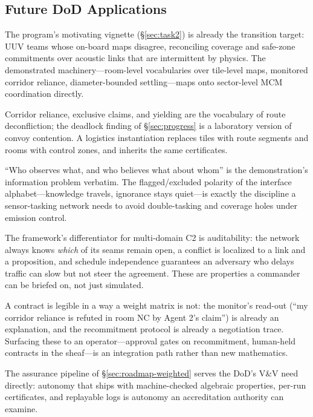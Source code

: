 \documentclass[11pt]{article}
\theoremstyle{definition}
\theoremstyle{remark}
\begin{document}
\subsection{Future DoD Applications}
\label{sec:roadmap-dod}

\begin{description}[leftmargin=1.6em, style=nextline]
\item[Mine countermeasures and littoral operations.]
The program's motivating vignette (\S\ref{sec:task2}) is already the transition target: UUV
teams whose on-board maps disagree, reconciling coverage and safe-zone commitments over
acoustic links that are intermittent by physics.
The demonstrated machinery---room-level vocabularies over tile-level maps, monitored corridor
reliance, diameter-bounded settling---maps onto sector-level MCM coordination directly.
\item[Contested logistics and resupply.]
Corridor reliance, exclusive claims, and yielding are the vocabulary of route deconfliction;
the deadlock finding of \S\ref{sec:progress} is a laboratory version of convoy contention.
A logistics instantiation replaces tiles with route segments and rooms with control zones, and
inherits the same certificates.
\item[Distributed ISR tasking.]
``Who observes what, and who believes what about whom'' is the demonstration's information
problem verbatim.
The flagged/excluded polarity of the interface alphabet---knowledge travels, ignorance stays
quiet---is exactly the discipline a sensor-tasking network needs to avoid double-tasking and
coverage holes under emission control.
\item[Command and control under degraded communications.]
The framework's differentiator for multi-domain C2 is auditability: the network always knows
\emph{which} of its seams remain open, a conflict is localized to a link and a proposition,
and schedule independence guarantees an adversary who delays traffic can slow but not steer
the agreement.
These are properties a commander can be briefed on, not just simulated.
\item[Human--machine teaming.]
A contract is legible in a way a weight matrix is not: the monitor's read-out (``my corridor
reliance is refuted in room NC by Agent 2's claim'') is already an explanation, and the
recommitment protocol is already a negotiation trace.
Surfacing these to an operator---approval gates on recommitment, human-held contracts in the
sheaf---is an integration path rather than new mathematics.
\item[Test, evaluation, and assurance of autonomy.]
The assurance pipeline of \S\ref{sec:roadmap-weighted} serves the DoD's V\&V need directly:
autonomy that ships with machine-checked algebraic properties, per-run certificates, and
replayable logs is autonomy an accreditation authority can examine.
\end{description}
\end{document}
